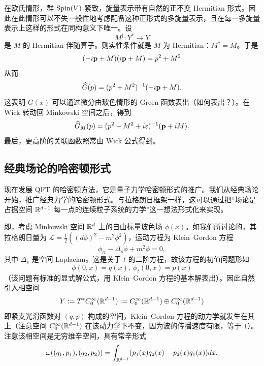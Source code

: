 在欧氏情形，群 ${\rm Spin}(V)$ 紧致，旋量表示带有自然的正不变 Hermitian 形式。因此在此情形可以不失一般性地考虑配备这种正形式的多旋量表示，且在每一多旋量表示上这样的形式在同构意义下唯一。设
$$
M^\dagger: Y^*\to Y
$$
是 $M$ 的 Hermitian 伴随算子。则实性条件就是 $M$ 为 Hermitian：$M^\dagger=M$。于是
$$
(-i\bold p+M)(i\bold p+M)=p^2+M^2
$$
从而
$$
\widehat G(p)=(p^2+M^2)^{-1}(-i\bold p+M).
$$
这表明 $G(x)$ 可以通过微分由玻色情形的 Green 函数表出（如何表出？）。在 Wick 转动回 Minkowski 空间之后，得到
$$
\widehat G_M(p)=(p^2-M^2+i\varepsilon)^{-1}(\bold
p+iM).
$$
最后，更高阶的关联函数照常由 Wick 公式得到。


\subsection{经典场论的哈密顿形式} \label{hfcft}

现在发展 QFT 的哈密顿方法，它是量子力学哈密顿形式的推广。我们从经典场论开始，推广经典力学的哈密顿形式。与拉格朗日框架一样，这可以通过把“场论是占据空间 $\Bbb R^{d-1}$ 每一点的连续粒子系统的力学”这一想法形式化来实现。

即，考虑 Minkowski 空间 $\Bbb R^d$ 上的自由标量玻色场 $\phi(x)$。如我们所讨论的，其拉格朗日量为 $\mathcal L=\frac{1}{2}((d\phi)^2-m^2\phi^2)$，运动方程为 Klein--Gordon 方程
$$
\phi_{tt}-\Delta_s\phi+m^2\phi=0,
$$
其中 $\Delta_s$ 是空间 Laplacian。这是关于 $t$ 的二阶方程，故该方程的初值问题形如
$$
\phi(0,x)=q(x),\ \phi_t(0,x)=p(x)
$$
（该问题有标准的显式解公式，用 Klein--Gordon 方程的基本解表出）。因此自然引入相空间
$$
Y:=T^*C^\infty_0(\Bbb R^{d-1}):=C^\infty_0(\Bbb R^{d-1})\oplus C^\infty_0(\Bbb R^{d-1})
$$
即紧支光滑函数对 $(q,p)$ 构成的空间，Klein--Gordon 方程的动力学就发生在其上（注意空间 $C^\infty_0(\Bbb R^{d-1})$ 在该动力学下不变，因为波的传播速度有限，等于 $1$）。注意该相空间是无穷维辛空间，具有常辛形式
$$
\omega((q_1,p_1),(q_2,p_2))=\int_{\Bbb R^{d-1}}(p_1(x)q_2(x)-p_2(x)q_1(x))dx.
$$

